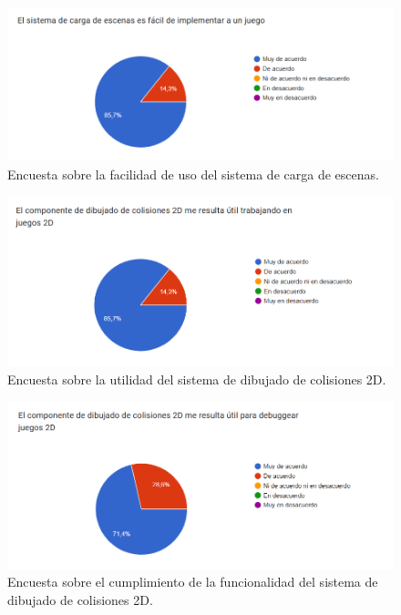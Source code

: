 \begin{figure}[H]
  \centering
  \includegraphics[width=450px,clip=true]{CUESTIONARIO_10.png}
  \caption{Encuesta sobre la facilidad de uso del sistema de carga de escenas.}
  \label{fig:CUESTIONARIO_10}
\end{figure}
\raggedbottom

\begin{figure}[H]
  \centering
  \includegraphics[width=450px,clip=true]{CUESTIONARIO_11.png}
  \caption{Encuesta sobre la utilidad del sistema de dibujado de colisiones 2D.}
  \label{fig:CUESTIONARIO_11}
\end{figure}
\raggedbottom

\begin{figure}[H]
  \centering
  \includegraphics[width=450px,clip=true]{CUESTIONARIO_12.png}
  \caption{Encuesta sobre el cumplimiento de la funcionalidad del sistema de dibujado de colisiones 2D.}
  \label{fig:CUESTIONARIO_12}
\end{figure}
\raggedbottom

